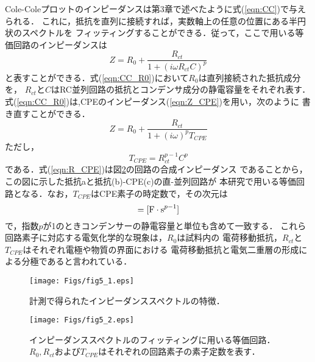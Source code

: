 Cole-Coleプロットのインピーダンスは第3章で述べたように式(\ref{eqn:CC})で与えられる．
これに，抵抗を直列に接続すれば，実数軸上の任意の位置にある半円状のスペクトルを
フィッティングすることができる．従って，ここで用いる等価回路のインピーダンスは
\begin{equation}
	Z=R_0 +\frac{R_{ct}}{1+\left( i\omega R_{ct}C\right)^p}
	\label{eqn:CC_R0}
\end{equation}
と表すことができる．式(\ref{eqn:CC_R0})において$R_0$は直列接続された抵抗成分を，
$R_{ct}$と$C$はRC並列回路の抵抗とコンデンサ成分の静電容量をそれぞれ表す．
式(\ref{eqn:CC_R0})は,CPEのインピーダンス(\ref{eqn:Z_CPE})を用い，次のように
書き直すことができる．
\begin{equation}
	Z=R_0 +\frac{R_{ct}}{1+\left( i\omega \right)^pT_{CPE}}
	\label{eqn:R_CPE}
\end{equation}
ただし，
\begin{equation}
	T_{CPE}=R_{ct}^{p-1}C^{p}
	\label{eqn:T_CPE}
\end{equation}
である．式(\ref{eqn:R_CPE})は図\ref{fig:fig5_2}の回路の合成インピーダンス
であることから，この図に示した抵抗aと抵抗(b)-CPE(c)の直-並列回路が
本研究で用いる等価回路となる．なお，$T_{CPE}$はCPE素子の時定数で，その次元は
\begin{equation}
	[T_{CPE}] =[ {\rm F\cdot s}^{p-1}]
	\label{eqn:}
\end{equation}
で，指数$p$が1のときコンデンサーの静電容量と単位も含めて一致する．
これら回路素子に対応する電気化学的な現象は，$R_0$は試料内の
電荷移動抵抗，$R_{ct}$と$T_{CPE}$はそれぞれ電極や物質の界面における
電荷移動抵抗と電気二重層の形成による分極であると言われている．
\begin{figure}[h]
	\begin{center}
	\texttt{[image: Figs/fig5\_1.eps]} 
	\end{center}
	\caption{
		計測で得られたインピーダンススペクトルの特徴．	
	} 
	\label{fig:fig5_1}
\end{figure}
\begin{figure}[h]
	\begin{center}
	\texttt{[image: Figs/fig5\_2.eps]} 
	\end{center}
	\caption{
		インピーダンススペクトルのフィッティングに用いる等価回路．
		$R_0,R_{ct}$および$T_{CPE}$はそれぞれの回路素子の素子定数を表す．
	} 
	\label{fig:fig5_2}
\end{figure}
